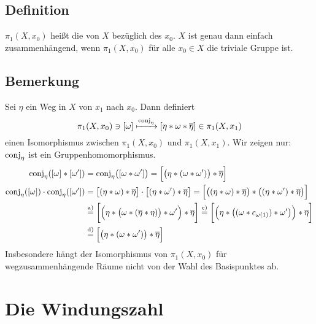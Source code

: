 \subsection[Definition: Fundamentalgruppe]{Definition} %
\label{sub:910}
$\pi_1(X, x_0)$ heißt die  von $X$ bezüglich des  $x_0$.
$X$ ist genau dann einfach zusammenhängend, wenn $\pi_1(X,x_0)$ für alle $x_0 \in X$ die triviale Gruppe ist.

\subsection[Bemerkung: Isomorphie zwischen Fundamentalgruppen]{Bemerkung} %
\label{sub:911}
Sei $\eta$ ein Weg in $X$ von $x_1$ nach $x_0$. Dann definiert
\[
	\pi_1(X,x_0) \ni [\omega] \xmapsto{\conj_\eta} \benbrace*{\eta * \omega * \overline{\eta}}  \in \pi_1(X,x_1)
\]
einen Isomorphismus zwischen $\pi_1(X,x_0)$ und $\pi_1(X,x_1)$. Wir zeigen nur: $\conj_\eta$ ist ein Gruppenhomomorphismus.
\begin{align*}
	\conj_\eta \enbrace*{ \benbrace*{\omega} * \benbrace*{\omega'}} &= \conj_\eta \enbrace[\big]{ \benbrace*{\omega * \omega'}} = \benbrace[\Big]{ \enbrace[\big]{\eta * (\omega * \omega')} * \overline{\eta}  }  \\
	\conj_\eta \enbrace*{[\omega]} \cdot \conj_\eta \enbrace*{[\omega']} &= \benbrace[\big]{(\eta * \omega) * \overline{\eta} } \cdot  \benbrace[\big]{(\eta * \omega') * \overline{\eta}} = \benbrace[\Big]{ \enbrace[\big]{ \enbrace*{\eta * \omega}* \overline{\eta}  } * \enbrace[\big]{\enbrace*{\eta * \omega'} * \overline{\eta}  }  } \\
	&\stackrel{\text{a)}}{=} \benbrace[\bigg]{ \enbrace[\Big]{\eta * \enbrace[\big]{\omega * \enbrace*{\overline{\eta} * \eta } }* \omega' } * \overline{\eta}  } 
	\stackrel{\text{c)}}{=} \benbrace[\bigg]{\enbrace[\Big]{ \eta * \enbrace[\big]{\enbrace{\omega * c_{\omega(1)}} * \omega' } } * \overline{\eta}} \\
	&\stackrel{\text{d)}}{=}
	\benbrace[\Big]{\enbrace[\big]{\eta * \enbrace*{\omega * \omega'} } * \overline{\eta}  } 
\end{align*}
Insbesondere hängt der Isomorphismus von $\pi_1(X,x_0)$ für wegzusammenhängende Räume nicht von der Wahl des Basispunktes ab.
\newpage

\section{Die Windungszahl} %
\label{sec:10}
